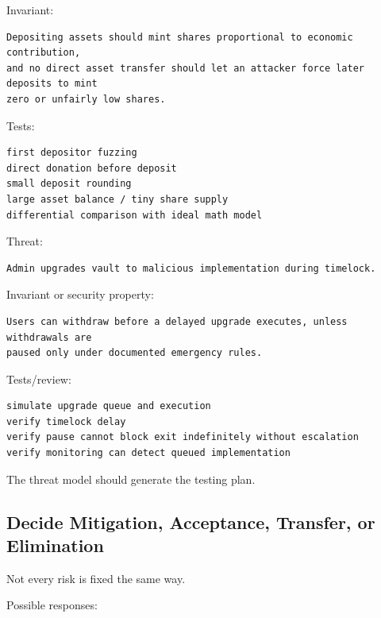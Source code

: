 Invariant:

\begin{lstlisting}
Depositing assets should mint shares proportional to economic contribution,
and no direct asset transfer should let an attacker force later deposits to mint
zero or unfairly low shares.
\end{lstlisting}

Tests:

\begin{lstlisting}
first depositor fuzzing
direct donation before deposit
small deposit rounding
large asset balance / tiny share supply
differential comparison with ideal math model
\end{lstlisting}

Threat:

\begin{lstlisting}
Admin upgrades vault to malicious implementation during timelock.
\end{lstlisting}

Invariant or security property:

\begin{lstlisting}
Users can withdraw before a delayed upgrade executes, unless withdrawals are
paused only under documented emergency rules.
\end{lstlisting}

Tests/review:

\begin{lstlisting}
simulate upgrade queue and execution
verify timelock delay
verify pause cannot block exit indefinitely without escalation
verify monitoring can detect queued implementation
\end{lstlisting}

The threat model should generate the testing plan.

\subsection{Decide Mitigation, Acceptance, Transfer, or Elimination}

Not every risk is fixed the same way.

Possible responses:


